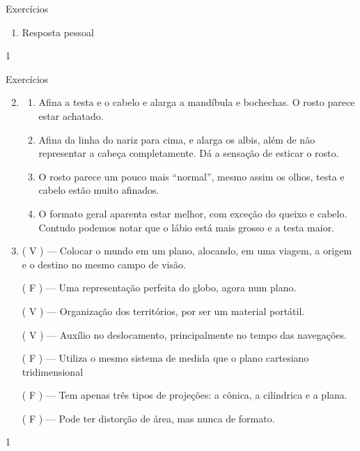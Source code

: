 \exercise
\begin{answer}{Exercícios}
{
	\exerciselist
	\begin{enumerate}
	\item Resposta pessoal
	\end{enumerate}
}{1}
\end{answer}
\clearmargin
\begin{answer}{Exercícios}
{
	\exerciselist
	\begin{enumerate}\setcounter{enumi}{1}
	\item 
	\begin{enumerate}
	\item Afina a testa e o cabelo e alarga a mandíbula e bochechas. O rosto parece estar achatado.

	\item Afina da linha do nariz para cima, e alarga os albis, além de não representar a cabeça completamente. Dá a sensação de esticar o rosto.

	\item O rosto parece um pouco mais “normal”, mesmo assim os olhos, testa e cabelo estão muito afinados.

	\item O formato geral aparenta estar melhor, com exceção do queixo e cabelo. Contudo podemos notar que o lábio está mais grosso e a testa maior.
	\end{enumerate}
	\item
	({ }{V}{ }) --- Colocar o mundo em um plano, alocando, em uma viagem, a origem e o destino no mesmo campo de visão.

	({ }{F}{ }) --- Uma representação perfeita do globo, agora num plano.

	({ }{V}{ }) --- Organização dos territórios, por ser um material portátil.

	({ }{V}{ }) --- Auxílio no deslocamento, principalmente no tempo das navegações.

	({ }{F}{ }) --- Utiliza o mesmo sistema de medida que o plano cartesiano tridimensional

	({ }{F}{ }) --- Tem apenas três tipos de projeções: a cônica, a cilíndrica e a plana.

	({ }{F}{ }) --- Pode ter distorção de área, mas nunca de formato.
	\end{enumerate}
}{1}
\end{answer}
\clearmargin
